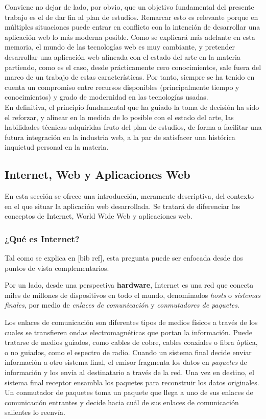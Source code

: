 \documentclass[a4paper]{article}
\begin{document}
    Conviene no dejar de lado, por obvio, que un objetivo fundamental del presente trabajo es el de dar fin al plan de estudios. Remarcar esto es relevante porque en múltiples situaciones puede entrar en conflicto con la intención de desarrollar una aplicación web lo más moderna posible. Como se explicará más adelante en esta memoria, el mundo de las tecnologías web es muy cambiante, y pretender desarrollar una aplicación web alineada con el estado del arte en la materia partiendo, como es el caso, desde prácticamente cero conocimientos, sale fuera del marco de un trabajo de estas características. Por tanto, siempre se ha tenido en cuenta un compromiso entre recursos disponibles (principalmente tiempo y conocimientos) y grado de modernidad en las tecnologías usadas.
    \\
    
    En definitiva, el principio fundamental que ha guiado la toma de decisión ha sido el reforzar, y alinear en la medida de lo posible con el estado del arte, las habilidades técnicas adquiridas fruto del plan de estudios, de forma a facilitar una futura integración en la industria web, a la par de satisfacer una histórica inquietud personal en la materia.

    \subsection{Internet, Web y Aplicaciones Web}
    En esta sección se ofrece una introducción, meramente descriptiva, del contexto en el que situar la aplicación web desarrollada. Se tratará de diferenciar los conceptos de Internet, World Wide Web y aplicaciones web.

    \subsubsection{¿Qué es Internet?}
    Tal como se explica en [bib ref], esta pregunta puede ser enfocada desde dos puntos de vista complementarios.
    
    Por un lado, desde una perspectiva \textbf{hardware}, Internet es una red que conecta miles de millones de dispositivos en todo el mundo, denominados \emph{hosts} o \emph{sistemas finales}, por medio de \emph{enlaces de comunicación} y \emph{conmutadores de paquetes}.
    
    Los enlaces de comunicación son diferentes tipos de medios físicos a través de los cuales se transfieren ondas electromagnéticas que portan la información. Puede tratarse de medios guiados, como cables de cobre, cables coaxiales o fibra óptica, o no guiados, como el espectro de radio. Cuando un sistema final decide enviar información a otro sistema final, el emisor fragmenta los datos en \emph{paquetes} de información y los envía al destinatario a través de la red. Una vez en destino, el sistema final receptor ensambla los paquetes para reconstruir los datos originales. Un conmutador de paquetes toma un paquete que llega a uno de sus enlaces de comunicación entrantes y decide hacia cuál de sus enlaces de comunicación salientes lo reenvía.
    
\end{document}
